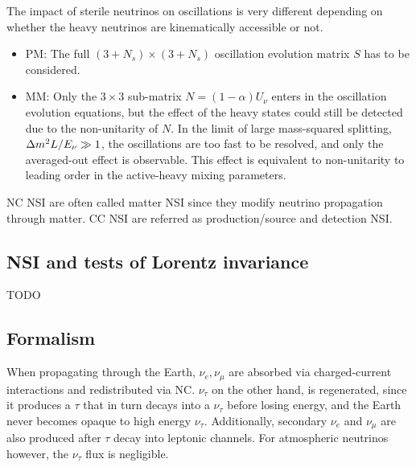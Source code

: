 \documentclass[twocolumn]{article}
\renewcommand{\a}{\ensuremath{\alpha}}
\renewcommand{\ne}{\ensuremath{\nu_e}}
\newcommand{\nm}{\ensuremath{\nu_\mu}}
\newcommand{\nt}{\ensuremath{\nu_\tau}}
\newcommand*{\dm}[1][]{%
  \Delta m^2\ifx\\#1\\\else_\text{#1}\fi
}
\begin{document}
The impact of sterile neutrinos on oscillations is very different depending on whether the heavy neutrinos are kinematically accessible or not.
\begin{itemize}
  \item PM: The full $(3+N_s) \times (3+N_s)$ oscillation evolution matrix $S$ has to be considered.
  \item MM: Only the $3 \times 3$ sub-matrix $N = (1-\a)U_\nu$ enters in the oscillation evolution equations, but the effect of the heavy states could still be detected due to the non-unitarity of $N$. In the limit of large mass-squared splitting, $\dm L/E_\nu \gg 1$, the oscillations are too fast to be resolved, and only the averaged-out effect is observable.  This effect is equivalent to non-unitarity to leading order in the active-heavy mixing parameters.
\end{itemize}

NC NSI are often called matter NSI since they modify neutrino propagation through matter. CC NSI are referred as production/source and detection NSI.
\subsection*{NSI and tests of Lorentz invariance}
TODO
\subsection*{Formalism}

When propagating through the Earth, $\ne, \nm$ are absorbed via charged-current interactions and redistributed via NC. $\nt$ on the other hand, is regenerated, since it produces a $\tau$ that in turn decays into a $\nt$ before losing energy, and the Earth never becomes opaque to high energy $\nt$. Additionally, secondary $\ne$ and $\nm$ are also produced after $\tau$ decay into leptonic channels. For atmospheric neutrinos however, the $\nt$ flux is negligible.
\end{document}
